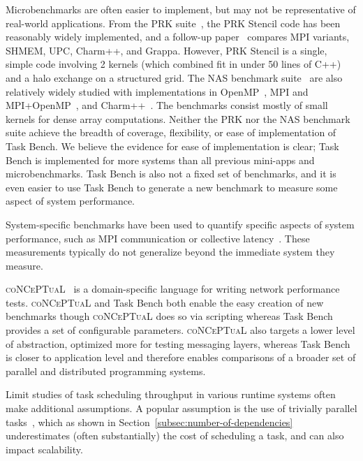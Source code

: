 Microbenchmarks are often easier to implement, but may not be
representative of real-world applications. From the PRK
suite~\cite{PRK14}, the PRK Stencil code has been reasonably widely
implemented, and a follow-up paper~\cite{PRKRuntimes16} compares MPI
variants, SHMEM, UPC, Charm++, and Grappa. However, PRK Stencil is a
single, simple code involving 2 kernels (which combined fit in under 50 lines
of C++) and a halo exchange on a structured grid. The NAS benchmark suite~\cite{NAS91, NAS95} are also relatively widely studied with
implementations in OpenMP~\cite{NASOpenMP99}, MPI and
MPI+OpenMP~\cite{NASMPIOpenMP00}, and
Charm++~\cite{NASCharm96}. The benchmarks consist mostly of small
kernels for dense array computations. Neither the PRK nor the NAS
benchmark suite achieve the breadth of coverage, flexibility, or ease
of implementation of Task Bench. We believe the evidence for ease of
implementation is clear; Task Bench is implemented for more systems
than all previous mini-apps and microbenchmarks. Task Bench is also
not a fixed set of benchmarks, and it is even easier to use Task Bench
to generate a new benchmark to measure some aspect of system
performance.

System-specific benchmarks have been used to quantify specific aspects
of system performance, such as MPI communication or collective
latency~\cite{MPPTest99, MPIBench01}. These measurements typically do
not generalize beyond the immediate system they measure.

\textsc{coNCePTuaL}~\cite{Conceptual07} is a domain-specific language
for writing network performance tests. \textsc{coNCePTuaL} and Task
Bench both enable the easy creation of new benchmarks though
\textsc{coNCePTuaL} does so via scripting whereas Task Bench provides
a set of configurable parameters. \textsc{coNCePTuaL} also targets a
lower level of abstraction, optimized more for testing messaging
layers, whereas Task Bench is closer to application level and
therefore enables comparisons of a broader set of parallel and
distributed programming systems.

Limit studies of task scheduling throughput in various runtime systems
often make additional assumptions. A popular assumption is the use of
trivially parallel tasks~\cite{Canary16, Armstrong14}, which as shown
in Section~\ref{subsec:number-of-dependencies} underestimates (often
substantially) the cost of scheduling a task, and can also impact scalability.
